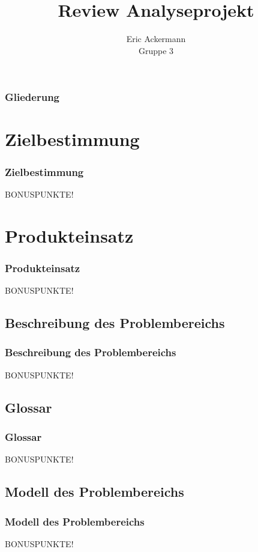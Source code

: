 \documentclass{beamer}
\begin{document}
			
	
	\title[Review Analyseprojekt]{Review Analyseprojekt}
	\author[Eric Ackermann]{Eric Ackermann\\ Gruppe 3}
	
	 \begin{frame}[title=Hauptgebaeude_Nacht.jpg]
	 \maketitle
 	\end{frame}
	 
	\begin{frame}
		\frametitle{Gliederung}
		\tableofcontents
	\end{frame}

\section{Zielbestimmung}		
\begin{frame}
\frametitle{Zielbestimmung}
BONUSPUNKTE!
\end{frame}

\section{Produkteinsatz}		
\begin{frame}
\frametitle{Produkteinsatz}
BONUSPUNKTE!
\end{frame}

\subsection{Beschreibung des Problembereichs}		
\begin{frame}
\frametitle{Beschreibung des Problembereichs}
BONUSPUNKTE!
\end{frame}

\subsection{Glossar}		
\begin{frame}
\frametitle{Glossar}
BONUSPUNKTE!
\end{frame}

\subsection{Modell des Problembereichs}		
\begin{frame}
\frametitle{Modell des Problembereichs}
BONUSPUNKTE!
\end{frame}
\end{document}
